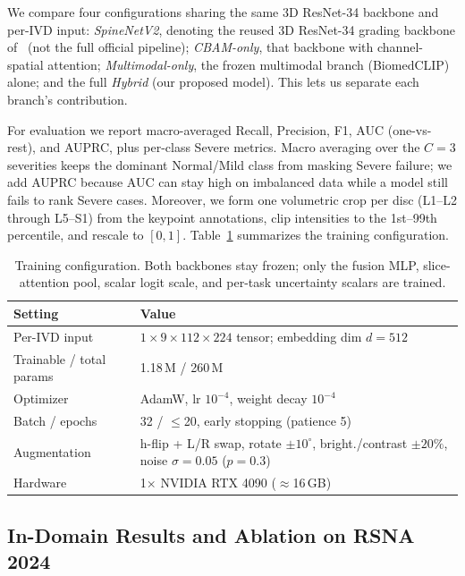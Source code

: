 \documentclass[runningheads]{llncs}
\begin{document}
We compare four configurations sharing the same 3D ResNet-34 backbone and per-IVD input: \emph{SpineNetV2}, denoting the reused 3D ResNet-34 grading backbone of~\cite{windsor2022} (not the full official pipeline); \emph{CBAM-only}, that backbone with channel-spatial attention; \emph{Multimodal-only}, the frozen multimodal branch (BiomedCLIP) alone; and the full \emph{Hybrid} (our proposed model). This lets us separate each branch's contribution.

For evaluation we report macro-averaged Recall, Precision, F1, AUC (one-vs-rest), and AUPRC, plus per-class Severe metrics. Macro averaging over the $C=3$ severities keeps the dominant Normal/Mild class from masking Severe failure; we add AUPRC because AUC can stay high on imbalanced data while a model still fails to rank Severe cases. Moreover, we form one volumetric crop per disc (L1--L2 through L5--S1) from the keypoint annotations, clip intensities to the 1st--99th percentile, and rescale to $[0,1]$. Table~\ref{tab:config} summarizes the training configuration.

\begin{table}[t]
\centering
\caption{Training configuration. Both backbones stay frozen; only the fusion MLP, slice-attention pool, scalar logit scale, and per-task uncertainty scalars are trained.}
\label{tab:config}
\footnotesize
\begin{tabular}{@{}l p{8.1cm}@{}}
\toprule
\textbf{Setting} & \textbf{Value} \\
\midrule
Per-IVD input & $1\times9\times112\times224$ tensor; embedding dim $d=512$ \\
Trainable / total params & 1.18\,M / 260\,M \\
Optimizer & AdamW, lr $10^{-4}$, weight decay $10^{-4}$ \\
Batch / epochs & 32 / $\leq$20, early stopping (patience 5) \\
Augmentation & h-flip + L/R swap, rotate $\pm10^{\circ}$, bright./contrast $\pm20\%$, noise $\sigma{=}0.05$ ($p{=}0.3$) \\
Hardware & 1$\times$ NVIDIA RTX 4090 ($\approx$16\,GB) \\
\bottomrule
\end{tabular}
\end{table}

\subsection{In-Domain Results and Ablation on RSNA 2024}\label{exp2}
\end{document}
